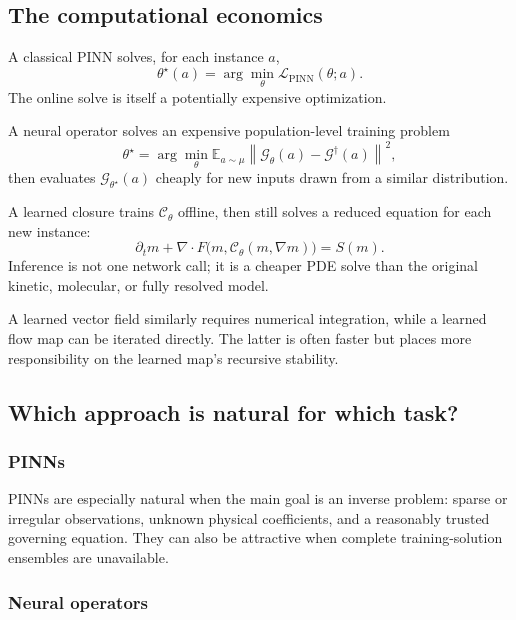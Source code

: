 \documentclass[11pt]{article}
\newcommand{\E}{\mathbb{E}}
\newcommand{\C}{\mathcal{C}}
\newcommand{\G}{\mathcal{G}}
\newcommand{\pinn}{\mathrm{PINN}}
\begin{document}
\subsection{The computational economics}

A classical PINN solves, for each instance \(a\),
\begin{equation}
 \theta^\star(a)=\arg\min_\theta\mathcal{L}_{\pinn}(\theta;a).
\end{equation}
The online solve is itself a potentially expensive optimization.

A neural operator solves an expensive population-level training problem
\begin{equation}
 \theta^\star
 =\arg\min_\theta
 \E_{a\sim\mu}
 \left\|\G_\theta(a)-\G^\dagger(a)\right\|^2,
\end{equation}
then evaluates \(\G_{\theta^\star}(a)\) cheaply for new inputs drawn from a similar distribution.

A learned closure trains \(\C_\theta\) offline, then still solves a reduced equation for each new instance:
\begin{equation}
 \partial_tm+\nabla\cdot F\bigl(m,\C_\theta(m,\nabla m)\bigr)=S(m).
\end{equation}
Inference is not one network call; it is a cheaper PDE solve than the original kinetic, molecular, or fully resolved model.

A learned vector field similarly requires numerical integration, while a learned flow map can be iterated directly. The latter is often faster but places more responsibility on the learned map's recursive stability.

\subsection{Which approach is natural for which task?}

\subsubsection{PINNs}

PINNs are especially natural when the main goal is an inverse problem: sparse or irregular observations, unknown physical coefficients, and a reasonably trusted governing equation. They can also be attractive when complete training-solution ensembles are unavailable.

\subsubsection{Neural operators}
\end{document}
